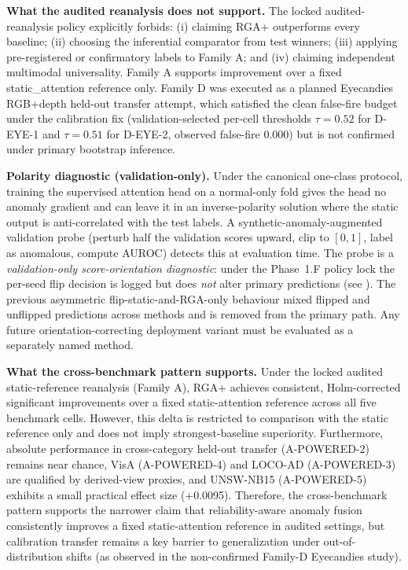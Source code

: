 \documentclass[10pt,conference]{IEEEtran}
\begin{document}
\noindent\textbf{What the audited reanalysis does not support.}
The locked audited-reanalysis policy explicitly forbids: (i) claiming RGA+ outperforms every baseline; (ii) choosing the inferential comparator from test winners; (iii) applying pre-registered or confirmatory labels to Family A; and (iv) claiming independent multimodal universality. Family A supports improvement over a fixed static\_attention reference only. Family D was executed as a planned Eyecandies RGB+depth held-out transfer attempt, which satisfied the clean false-fire budget under the calibration fix (validation-selected per-cell thresholds $\tau = 0.52$ for D-EYE-1 and $\tau = 0.51$ for D-EYE-2, observed false-fire $0.000$) but is not confirmed under primary bootstrap inference.

\noindent\textbf{Polarity diagnostic (validation-only).} Under the
canonical one-class protocol, training the supervised attention head
on a normal-only fold gives the head no anomaly gradient and can
leave it in an inverse-polarity solution where the static output is
anti-correlated with the test labels. A synthetic-anomaly-augmented
validation probe (perturb half the validation scores upward, clip to
$[0,1]$, label as anomalous, compute AUROC) detects this at
evaluation time. The probe is a \emph{validation-only score-orientation
diagnostic}: under the Phase~1.F policy lock the per-seed flip
decision is logged but does \emph{not} alter primary predictions
(see ). The
previous asymmetric flip-static-and-RGA-only behaviour mixed
flipped and unflipped predictions across methods and is removed
from the primary path. Any future orientation-correcting deployment
variant must be evaluated as a separately named method.

\noindent\textbf{What the cross-benchmark pattern supports.} Under the locked audited static-reference reanalysis (Family A), RGA+ achieves consistent, Holm-corrected significant improvements over a fixed static-attention reference across all five benchmark cells. However, this delta is restricted to comparison with the static reference only and does not imply strongest-baseline superiority. Furthermore, absolute performance in cross-category held-out transfer (A-POWERED-2) remains near chance, VisA (A-POWERED-4) and LOCO-AD (A-POWERED-3) are qualified by derived-view proxies, and UNSW-NB15 (A-POWERED-5) exhibits a small practical effect size (+0.0095). Therefore, the cross-benchmark pattern supports the narrower claim that reliability-aware anomaly fusion consistently improves a fixed static-attention reference in audited settings, but calibration transfer remains a key barrier to generalization under out-of-distribution shifts (as observed in the non-confirmed Family-D Eyecandies study).
\end{document}
